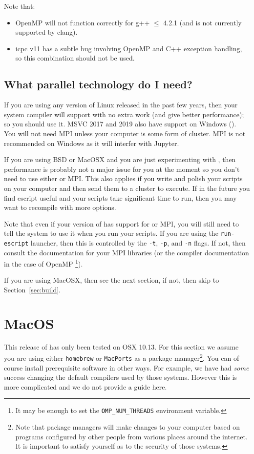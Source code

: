 Note that:
\begin{itemize}
 \item OpenMP will not function correctly for g++ $\leq$ 4.2.1 (and is not currently supported by clang).
 \item icpc v11 has a subtle bug involving OpenMP and C++ exception handling, so this combination should not be used.
\end{itemize}

\subsection{What parallel technology do I need?}\label{sec:needpar} If you are
using any version of Linux released in the past few years, then your system
compiler will support \openmp with no extra work (and give better performance);
so you should use it. MSVC 2017 and 2019 also have \openmp support on Windows
(). You will not need MPI unless your computer is some form of
cluster. MPI is not recommended on Windows as it will interfer with Jupyter.

If you are using BSD or MacOSX and you are just experimenting with \escript, then performance is
probably not a major issue for you at the moment so you don't need to use either \openmp or MPI.
This also applies if you write and polish your scripts on your computer and then send them to a cluster to execute.
If in the future you find escript useful and your scripts take significant time to run, then you may want to recompile
\escript with more options.



Note that even if your version of \escript has support for \openmp or MPI, you will still need to tell the system to
use it when you run your scripts.
If you are using the \texttt{run-escript} launcher, then this is controlled by
the \texttt{-t}, \texttt{-p}, and \texttt{-n} flags.
If not, then consult the documentation for your MPI libraries (or the compiler documentation in the case of OpenMP
\footnote{It may be enough to set the \texttt{OMP\_NUM\_THREADS} environment variable.}).

If you are using MacOSX, then see the next section, if not, then skip to Section~\ref{sec:build}.

\section{MacOS}
This release of \escript has only been tested on OSX 10.13.
For this section we assume you are using either \texttt{homebrew} or \texttt{MacPorts} as a package
manager\footnote{Note that package managers will make changes to your computer based on programs configured by other people from
various places around the internet. It is important to satisfy yourself as to the security of those systems.}.
You can of course install prerequisite software in other ways.
For example, we have had \emph{some} success changing the default
compilers used by those systems. However this is more complicated and we do not provide a guide here.

